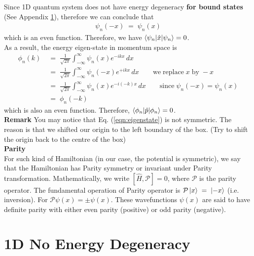 \documentclass[12pt,a4paper]{article}
\begin{document}
Since 1D quantum system does not have energy degeneracy \textbf{for bound states} (See Appendix \ref{sec:no_degeneracy}), therefore we can conclude that
\begin{align}
	\psi_{n}(-x) \; = \; \psi_{n}(x) \label{eqn:even_parity}
\end{align}
which is an even function. Therefore, we have $\braket{\psi_{n} | \hat{x} | \psi_{n}} = 0$.\\

As a result, the energy eigen-state in momentum space is
\begin{align}
	\phi_{n}(k) \; &= \; \frac{1}{\sqrt{2\pi}} \int_{-\infty}^{\infty} \psi_{n}(x) e^{-ikx} \, dx \\
	\; &= \; \frac{1}{\sqrt{2\pi}} \int_{-\infty}^{\infty} \psi_{n}(-x) e^{+ikx} \, dx \qquad \mathrm{we \; replace \;} x \; \mathrm{by} \; -x \\
	\; &= \; \frac{1}{\sqrt{2\pi}} \int_{-\infty}^{\infty} \psi_{n}(x) e^{-i(-k)x} \, dx \qquad \mathrm{since} \; \psi_{n}(-x) = \psi_{n}(x) \\
	\; &= \;
	\phi_{n}(-k)
\end{align}
which is also an even function. Therefore, $\braket{\phi_{n} | \hat{p} | \phi_{n}} = 0$.\\

\noindent
\textbf{Remark}
You may notice that Eq. (\ref{eqn:eigenstate}) is not symmetric. The reason is that we shifted our origin to the left boundary of the box. (Try to shift the origin back to the centre of the box)\\

\textbf{Parity}\\
For such kind of Hamiltonian (in our case, the potential is symmetric), we say that the Hamiltonian has Parity symmetry or invariant under Parity transformation. Mathematically, we write $[\hat{H}, \mathcal{P}] = 0$, where $\mathcal{P}$ is the parity operator. The fundamental operation of Parity operator is $\mathcal{P} \ket{x} \; = \; \ket{-x}$ (i.e. inversion). For $\mathcal{P} \psi(x) = \pm \psi(x)$. These wavefunctions $\psi(x)$ are said to have definite parity with either even parity (positive) or odd parity (negative).


\clearpage

\appendix
\section{1D No Energy Degeneracy} \label{sec:no_degeneracy}
\end{document}
